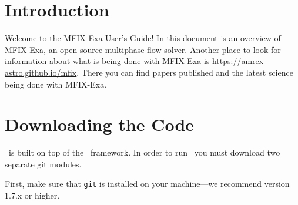 
\section{Introduction}

Welcome to the MFIX-Exa User's Guide!  In this document is an overview of MFIX-Exa, an 
open-source multiphase flow solver. 
Another place to look for information about what is being done with MFIX-Exa is
{\url{https://amrex-astro.github.io/mfix}}. There you can find papers published
and the latest science being done with MFIX-Exa.

\section{Downloading the Code}

\amrex\ is built on top of the \amrex\ framework.  In order to run
\amrex\, you must download two separate git modules.

\vspace{.1in}

\noindent First, make sure that {\tt git} is installed on your machine---we recommend version 1.7.x or higher.

\vspace{.1in}

